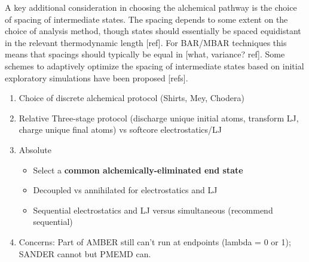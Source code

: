 \documentclass[9pt,bestpractices]{livecoms}
\begin{document}
A key additional consideration in choosing the alchemical pathway is the choice of spacing of intermediate states.
The spacing depends to some extent on the choice of analysis method, though states should essentially be spaced equidistant in the relevant thermodynamic length [ref].
For BAR/MBAR techniques this means that spacings should typically be equal in [what, variance? ref].
Some schemes to adaptively optimize the spacing of intermediate states based on initial exploratory simulations have been proposed [refs].

\begin{enumerate}
\item Choice of discrete alchemical protocol (Shirts, Mey, Chodera)
\item Relative
Three-stage protocol (discharge unique initial atoms, transform LJ, charge unique final atoms) vs softcore electrostatics/LJ

\item Absolute
	\begin{itemize}
	\item Select a \textbf{common alchemically-eliminated end state}
	\item Decoupled vs annihilated for electrostatics and LJ
	\item Sequential electrostatics and LJ versus simultaneous (recommend sequential)

\end{itemize}
\item Concerns:
Part of AMBER still can’t run at endpoints (lambda = 0 or 1); SANDER cannot but PMEMD can.

\end{enumerate}
\end{document}
